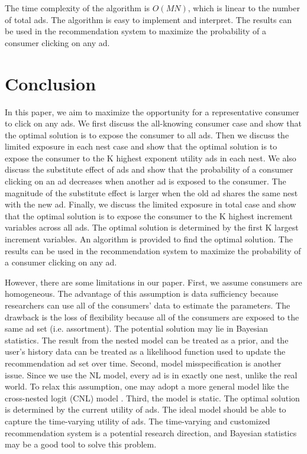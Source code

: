 \documentclass[12pt]{article}
\theoremstyle{definition}
\begin{document}
\begin{sloppypar}
The time complexity of the algorithm is $O(MN)$, which is linear to the number of total ads. The algorithm is easy to implement and interpret. The results can be used in the recommendation system to maximize the probability of a consumer clicking on any ad.

\section{Conclusion}
In this paper, we aim to maximize the opportunity for a representative consumer to click on any ads. We first discuss the all-knowing consumer case and show that the optimal solution is to expose the consumer to all ads. Then we discuss the limited exposure in each nest case and show that the optimal solution is to expose the consumer to the K highest exponent utility ads in each nest. We also discuss the substitute effect of ads and show that the probability of a consumer clicking on an ad decreases when another ad is exposed to the consumer. The magnitude of the substitute effect is larger when the old ad shares the same nest with the new ad. Finally, we discuss the limited exposure in total case and show that the optimal solution is to expose the consumer to the K highest increment variables across all ads. The optimal solution is determined by the first K largest increment variables. An algorithm is provided to find the optimal solution. The results can be used in the recommendation system to maximize the probability of a consumer clicking on any ad.

However, there are some limitations in our paper. First, we assume consumers are homogeneous. The advantage of this assumption is data sufficiency because researchers can use all of the consumers' data to estimate the parameters. The drawback is the loss of flexibility because all of the consumers are exposed to the same ad set (i.e. assortment). The potential solution may lie in Bayesian statistics. The result from the nested model can be treated as a prior, and the user's history data can be treated as a likelihood function used to update the recommendation ad set over time. Second, model misspecification is another issue. Since we use the NL model, every ad is in exactly one nest, unlike the real world. To relax this assumption, one may adopt a more general model like the cross-nested logit (CNL) model \textcite{vovsha}. Third, the model is static. The optimal solution is determined by the current utility of ads. The ideal model should be able to capture the time-varying utility of ads. The time-varying and customized recommendation system is a potential research direction, and Bayesian statistics may be a good tool to solve this problem.


\end{sloppypar}
\end{document}
